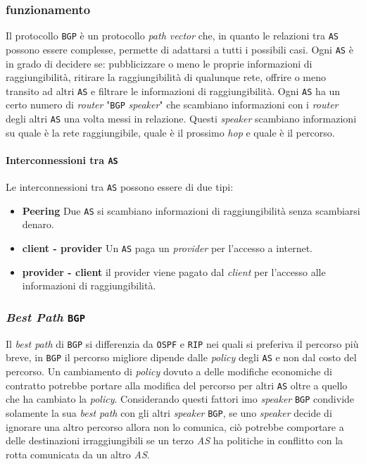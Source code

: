         \subsubsection{funzionamento}
            Il protocollo \texttt{BGP} è un protocollo \textit{path vector} che, in quanto le relazioni tra \texttt{AS} possono essere complesse, permette di adattarsi a tutti i possibili casi. Ogni \texttt{AS} è in grado di decidere se: pubblicizzare o meno le proprie informazioni di raggiungibilità, ritirare la raggiungibilità di qualunque rete, offrire o meno transito ad altri \texttt{AS} e filtrare le informazioni di raggiungibilità.\newline
            Ogni \texttt{AS} ha un certo numero di \textit{router} "\texttt{BGP} \textit{speaker}" che scambiano informazioni con i \textit{router} degli altri \texttt{AS} una volta messi in relazione. Questi \textit{speaker} scambiano informazioni su quale è la rete raggiungibile, quale è il prossimo \textit{hop} e quale è il percorso.
            \paragraph{Interconnessioni tra \texttt{AS}} Le interconnessioni tra \texttt{AS} possono essere di due tipi: \begin{itemize}
                \item \textbf{Peering} Due \texttt{AS} si scambiano informazioni di raggiungibilità senza scambiarsi denaro.
                \item \textbf{client - provider} Un \texttt{AS} paga un \textit{provider} per l'accesso a internet.
                \item \textbf{provider - client} il provider viene pagato dal \textit{client} per l'accesso alle informazioni di raggiungibilità.
            \end{itemize}
        \subsubsection{\textit{Best Path} \texttt{BGP}}
            Il \textit{best path} di \texttt{BGP} si differenzia da \texttt{OSPF} e \texttt{RIP} nei quali si preferiva il percorso più breve, in \texttt{BGP} il percorso migliore dipende dalle \textit{policy} degli \texttt{AS} e non dal costo del percorso. Un cambiamento di \textit{policy} dovuto a delle modifiche economiche di contratto potrebbe portare alla modifica del percorso per altri \texttt{AS} oltre a quello che ha cambiato la \textit{policy}.\newline
            Considerando questi fattori imo \textit{speaker} \texttt{BGP} condivide solamente la sua \textit{best path} con gli altri \textit{speaker} \texttt{BGP}, se uno \textit{speaker} decide di ignorare una altro percorso allora non lo comunica, ciò potrebbe comportare a delle destinazioni irraggiungibili se un terzo \textit{AS} ha politiche in conflitto con la rotta comunicata da un altro \textit{AS}.
            
